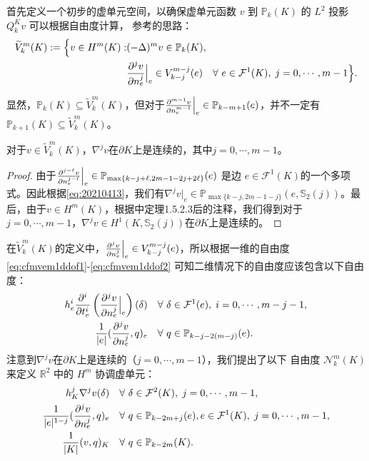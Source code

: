 首先定义一个初步的虚单元空间，以确保虚单元函数 $v$ 到 $\mathbb{P}_k(K)$ 的 $L^2$ 
投影 $Q_k^{K}v$ 可以根据自由度计算，
参考\cite{AhmadAlsaediBrezziMariniEtAl2013}的思路：
\begin{align*}
\widetilde{V}_k^m(K):=\Big\{ v\in H^m(K): &(-\Delta)^mv\in \mathbb P_{k}(K), \\
&\frac{\partial^jv}{\partial n_{e}^j}\Big|_e\in V_{k-j}^{m-j}(e)\quad\forall~e\in\mathcal F^{1}(K),\; j=0,\cdots, m-1\Big\}.    
\end{align*}

显然，$\mathbb P_k(K)\subseteq\widetilde{V}_k^m(K)$，但对于$\frac{\partial^{m-1}v}{\partial n_e^{m-1}}\Big|_e\in\mathbb P_{k-m+1}(e)$，并不一定有$\mathbb P_{k+1}(K)\subseteq\widetilde{V}_k^m(K)$。

\begin{lemma}\label{lem:continuous2d}
对于$v\in\widetilde{V}_k^m(K)$，$\nabla^jv$在$\partial K$上是连续的，其中$j=0,\cdots, m-1$。
\end{lemma}
\begin{proof}
由于$\frac{\partial^{j-\ell}v}{\partial n_e^{j-\ell}}\Big|_e\in \mathbb
P_{\max\{k-j+\ell, 2m-1-2j+2\ell\}}(e)$ 是边 $e\in\mathcal
F^1(K)$的一个多项式。因此根据\eqref{eq:20210413}，我们有$\nabla^jv|_e\in\mathbb
P_{\max\{k-j, 2m-1-j\}}(e,\mathbb S_2(j))$。最后，由于$v\in
H^m(K)$，根据\cite{Grisvard1985}中定理1.5.2.3后的注释，我们得到对于$j=0,\cdots,
m-1$，$\nabla^jv\in H^1(K,\mathbb S_2(j))$在$\partial K$上是连续的。
\end{proof}

在$\widetilde{V}_k^m(K)$的定义中，$\frac{\partial^jv}{\partial
n_e^j}\Big|_e\in
V_{k-j}^{m-j}(e)$，所以根据一维的自由度\eqref{eq:cfmvem1ddof1}-\eqref{eq:cfmvem1ddof2}
可知二维情况下的自由度应该包含以下自由度：
\begin{align*}
h_e^i\frac{\partial^i}{\partial t_e^i}\left(\frac{\partial^jv}{\partial n_e^j}\Big|_e\right)(\delta) & \quad\forall~\delta\in\mathcal F^{1}(e), \;i=0,\cdots,m-j-1, \\
\frac{1}{|e|}(\frac{\partial^jv}{\partial n_e^j}, q)_e & \quad\forall~q\in\mathbb P_{k-j-2(m-j)}(e). 
\end{align*}
注意到$\nabla^jv$在$\partial K$上是连续的（$j=0,\cdots, m-1$），我们提出了以下
自由度 $\mathcal N_k^m(K)$ 来定义 $\mathbb{R}^2$ 中的 $H^m$ 协调虚单元：
\begin{align}
h_K^j\nabla^{j}v(\delta) & \quad\forall~\delta\in\mathcal F^{2}(K), \;j=0,\cdots,m-1, \label{eq:cfmvem2ddof1}\\
\frac{1}{|e|^{1-j}}(\frac{\partial^jv}{\partial n_e^j}, q)_e & \quad\forall~q\in\mathbb P_{k-2m+j}(e), e\in\mathcal F^{1}(K), \;j=0,\cdots,m-1, \label{eq:cfmvem2ddof2}\\
\frac{1}{|K|}(v, q)_K & \quad\forall~q\in\mathbb P_{k-2m}(K). \label{eq:cfmvem2ddof3}
\end{align}

